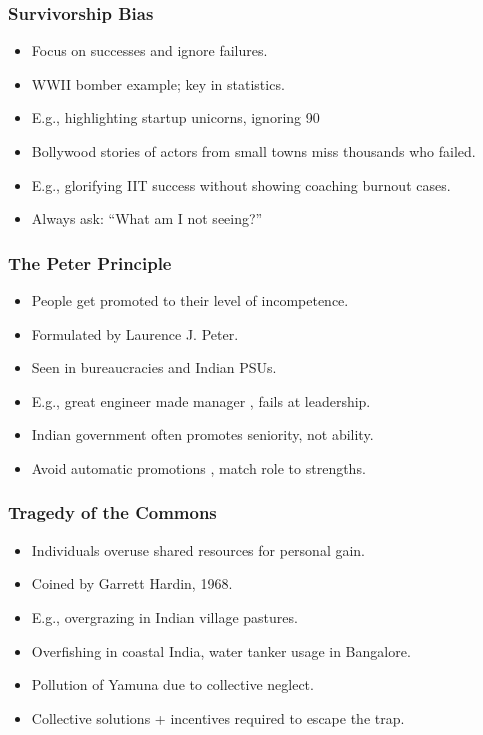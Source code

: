 \begin{frame}[fragile]\frametitle{Survivorship Bias}
  \begin{itemize}
    \item Focus on successes and ignore failures.
    \item WWII bomber example; key in statistics.
    \item E.g., highlighting startup unicorns, ignoring 90%
    \item Bollywood stories of actors from small towns miss thousands who failed.
    \item E.g., glorifying IIT success without showing coaching burnout cases.
    \item Always ask: ``What am I not seeing?''
  \end{itemize}
\end{frame}

\begin{frame}[fragile]\frametitle{The Peter Principle}
  \begin{itemize}
    \item People get promoted to their level of incompetence.
    \item Formulated by Laurence J. Peter.
    \item Seen in bureaucracies and Indian PSUs.
    \item E.g., great engineer made manager , fails at leadership.
    \item Indian government often promotes seniority, not ability.
    \item Avoid automatic promotions , match role to strengths.
  \end{itemize}
\end{frame}

\begin{frame}[fragile]\frametitle{Tragedy of the Commons}
  \begin{itemize}
    \item Individuals overuse shared resources for personal gain.
    \item Coined by Garrett Hardin, 1968.
    \item E.g., overgrazing in Indian village pastures.
    \item Overfishing in coastal India, water tanker usage in Bangalore.
    \item Pollution of Yamuna due to collective neglect.
    \item Collective solutions + incentives required to escape the trap.
  \end{itemize}
\end{frame}

